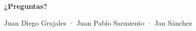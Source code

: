 \documentclass[aspectratio=169,11pt]{beamer}
\begin{document}
\begin{frame}[plain,c]
  \begin{center}
    {\Huge\bfseries\color{acento} ¿Preguntas?\par}
    \vspace{0.5cm}
    {\large Juan Diego Grajales · Juan Pablo Sarmiento · Jan Sánchez\par}
  \end{center}
\end{frame}
\end{document}
